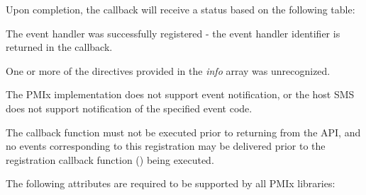 \begin{arglist}
\end{arglist}

Upon completion, the callback will receive a status based on the following table:

\begin{constantdesc}
\item {} The event handler was successfully registered - the event handler identifier is returned in the callback.
\item {} One or more of the directives provided in the \textit{info} array was unrecognized.
\item {} The \ac{PMIx} implementation does not support event notification, or the host \ac{SMS} does not support notification of the specified event code.
\end{constantdesc}

The callback function must not be executed prior to returning from the \ac{API}, and no events corresponding to this registration may be delivered prior to the registration callback function () being executed.

\reqattrstart
The following attributes are required to be supported by all \ac{PMIx} libraries:


\divider

